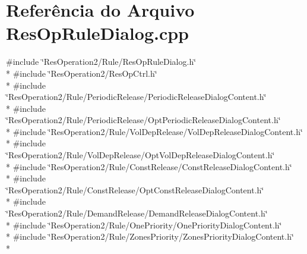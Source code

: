 \section{Referência do Arquivo Res\+Op\+Rule\+Dialog.\+cpp}
\label{_2_rule_2_res_op_rule_dialog_8cpp}
{\ttfamily \#include \char`\"{}Res\+Operation2/\+Rule/\+Res\+Op\+Rule\+Dialog.\+h\char`\"{}}\\*
{\ttfamily \#include \char`\"{}Res\+Operation2/\+Res\+Op\+Ctrl.\+h\char`\"{}}\\*
{\ttfamily \#include \char`\"{}Res\+Operation2/\+Rule/\+Periodic\+Release/\+Periodic\+Release\+Dialog\+Content.\+h\char`\"{}}\\*
{\ttfamily \#include \char`\"{}Res\+Operation2/\+Rule/\+Periodic\+Release/\+Opt\+Periodic\+Release\+Dialog\+Content.\+h\char`\"{}}\\*
{\ttfamily \#include \char`\"{}Res\+Operation2/\+Rule/\+Vol\+Dep\+Release/\+Vol\+Dep\+Release\+Dialog\+Content.\+h\char`\"{}}\\*
{\ttfamily \#include \char`\"{}Res\+Operation2/\+Rule/\+Vol\+Dep\+Release/\+Opt\+Vol\+Dep\+Release\+Dialog\+Content.\+h\char`\"{}}\\*
{\ttfamily \#include \char`\"{}Res\+Operation2/\+Rule/\+Const\+Release/\+Const\+Release\+Dialog\+Content.\+h\char`\"{}}\\*
{\ttfamily \#include \char`\"{}Res\+Operation2/\+Rule/\+Const\+Release/\+Opt\+Const\+Release\+Dialog\+Content.\+h\char`\"{}}\\*
{\ttfamily \#include \char`\"{}Res\+Operation2/\+Rule/\+Demand\+Release/\+Demand\+Release\+Dialog\+Content.\+h\char`\"{}}\\*
{\ttfamily \#include \char`\"{}Res\+Operation2/\+Rule/\+One\+Priority/\+One\+Priority\+Dialog\+Content.\+h\char`\"{}}\\*
{\ttfamily \#include \char`\"{}Res\+Operation2/\+Rule/\+Zones\+Priority/\+Zones\+Priority\+Dialog\+Content.\+h\char`\"{}}\\*
